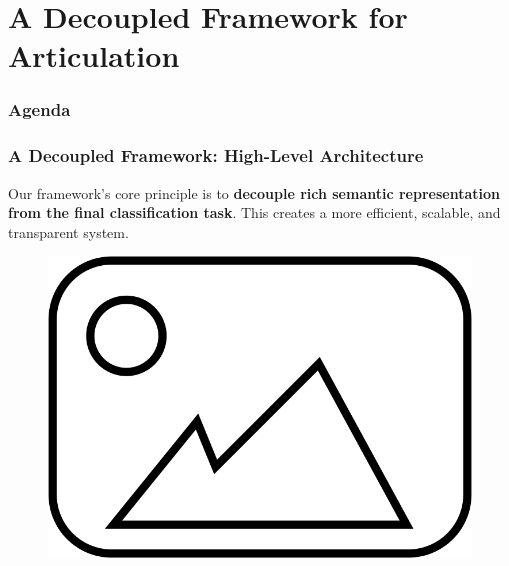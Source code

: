 \documentclass[aspectratio=169,10pt]{beamer}
\begin{document}
\section{A Decoupled Framework for Articulation}

\begin{frame}
    \frametitle{Agenda}
    \tableofcontents[currentsection]
\end{frame}

\begin{frame}
    \frametitle{A Decoupled Framework: High-Level Architecture}
    
    Our framework's core principle is to \textbf{decouple rich semantic representation from the final classification task}. This creates a more efficient, scalable, and transparent system.
    
    \vspace{1em}
    
    
    \begin{figure}
        \centering
        \includegraphics[scale=0.25]{placeholder.png}
    \end{figure}
    
\end{frame}
\end{document}
